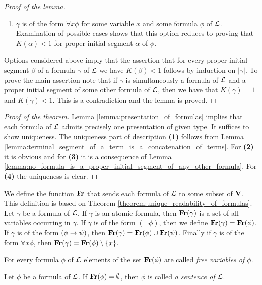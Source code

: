 \begin{proof}[Proof of the lemma]
\begin{enumerate}[label=\textbf{(\arabic*)}, leftmargin=3.0em]
\item $\gamma$ is of the form $\forall x \phi$ for some variable $x$ and some formula $\phi$ of ${\mathcal L}$. Examination of possible cases shows that this option reduces to proving that $K(\alpha) < 1$ for proper initial segment $\alpha$ of $\phi$.
\end{enumerate}
Options considered above imply that the assertion that for every proper initial segment $\beta$ of a formula $\gamma$ of ${\mathcal L}$ we have $K(\beta) < 1$ follows by induction on $|\gamma|$. To prove the main assertion note that if $\gamma$ is simultaneously a formula of ${\mathcal L}$ and a proper initial segment of some other formula of ${\mathcal L}$, then we have that $K(\gamma) = 1$ and $K(\gamma) < 1$. This is a contradiction and the lemma is proved.
\end{proof}

\begin{proof}[Proof of the theorem]
Lemma \ref{lemma:presentation_of_formulas} implies that each formula of ${\mathcal L}$ admits precisely one presentation of given type. It suffices to show uniqueness. The uniqueness part of description \textbf{(1)} follows from Lemma \ref{lemma:terminal_segment_of_a_term_is_a_concatenation_of_terms}. For \textbf{(2)} it is obvious and for \textbf{(3)} it is a consequence of Lemma \ref{lemma:no_formula_is_a_proper_initial_segment_of_any_other_formula}. For \textbf{(4)} the uniqueness is clear.
\end{proof}
\noindent
We define the function $\mathbf{Fr}$ that sends each formula of ${\mathcal L}$ to some subset of $\mathbf{V}$. This definition is based on Theorem \ref{theorem:unique_readability_of_formulas}. Let $\gamma$ be a formula of ${\mathcal L}$. If $\gamma$ is an atomic formula, then $\mathbf{Fr}(\gamma)$ is a set of all variables occurring in $\gamma$. If $\gamma$ is of the form $(\neg \phi)$, then we define $\mathbf{Fr}(\gamma) = \mathbf{Fr}(\phi)$. If $\gamma$ is of the form $(\phi \rightarrow \psi)$, then $\mathbf{Fr}(\gamma) = \mathbf{Fr}(\phi)\cup \mathbf{Fr}(\psi)$. Finally if $\gamma$ is of the form $\forall x\phi$, then $\mathbf{Fr}(\gamma) = \mathbf{Fr}(\phi) \setminus \{x\}$.

\begin{definition}
For every formula $\phi$ of ${\mathcal L}$ elements of the set $\mathbf{Fr}(\phi)$ are called \textit{free variables of $\phi$}.
\end{definition}

\begin{definition}
Let $\phi$ be a formula of ${\mathcal L}$. If $\mathbf{Fr}(\phi)=\emptyset$, then $\phi$ is called \textit{a sentence of ${\mathcal L}$}.
\end{definition}

